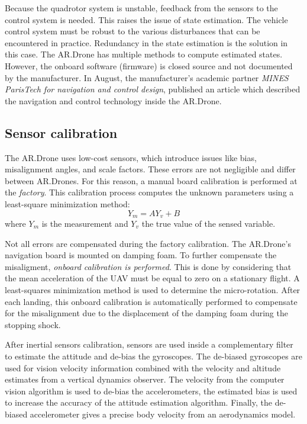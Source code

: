 Because the quadrotor system is unstable, feedback from the sensors to the control system is needed.
This raises the issue of state estimation.
The vehicle control system must be robust to the various disturbances that can be encountered in practice.
Redundancy in the state estimation is the solution in this case.
The AR.Drone has multiple methods to compute estimated states.
However, the onboard software (firmware) is closed source and not documented by the manufacturer.
In August, the manufacturer's academic partner \textit{MINES ParisTech for navigation and control design}, published an article \cite{bristeau2011navigation} which described the navigation and control technology inside the AR.Drone.



\subsection{Sensor calibration}
The AR.Drone uses low-cost sensors, which introduce issues like bias, misalignment angles, and scale factors.
These errors are not negligible and differ between AR.Drones.
For this reason, a manual board calibration is performed at the \textit{factory}.
This calibration process computes the unknown parameters using a least-square minimization method:
\begin{equation}
Y_m = AY_v + B
\end{equation}
where $Y_m$ is the measurement and $Y_v$ the true value of the sensed variable.

Not all errors are compensated during the factory calibration.
The AR.Drone's navigation board is mounted on damping foam.
To further compensate the misaligment, \textit{onboard calibration is performed}.
This is done by considering that the mean acceleration of the UAV must be equal to zero on a stationary flight.
A least-squares minimization method is used to determine the micro-rotation.
After each landing, this onboard calibration is automatically performed to compensate for the misalignment due to the displacement of the damping foam during the stopping shock.

After inertial sensors calibration, sensors are used inside a complementary filter to estimate the attitude and de-bias the gyroscopes.
The de-biased gyroscopes are used for vision velocity information combined with the velocity and altitude estimates from a vertical dynamics observer.
The velocity from the computer vision algorithm is used to de-bias the accelerometers, the estimated bias is used to increase the accuracy of the attitude estimation algorithm.
Finally, the de-biased accelerometer gives a precise body velocity from an aerodynamics model.


